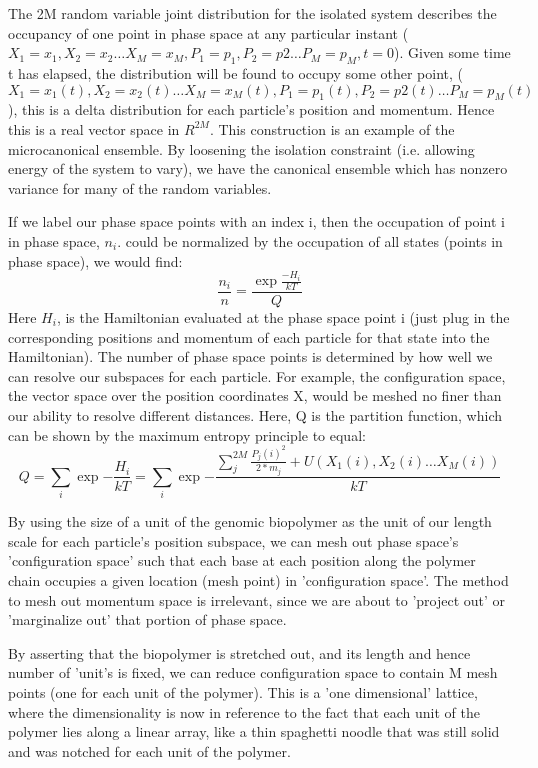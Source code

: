   The 2M random variable joint distribution for the isolated system describes the occupancy of one point in phase space at any particular instant ($X_1=x_1,X_2=x_2\dotsc X_M=x_M, P_1=p_1,P_2=p2\dotsc P_M= p_M,t=0$).  Given some time t has elapsed, the distribution will be found to occupy some other point, ($X_1=x_1(t),X_2=x_2(t)\dotsc X_M=x_M(t), P_1=p_1(t),P_2=p2(t)\dotsc P_M=p_M(t)$), this is a delta distribution for each particle's position and momentum\cite{vankampen}.  Hence this is a real vector space in $R^{2M}$.
     This construction is an example of the microcanonical ensemble.  By loosening the isolation constraint (i.e. allowing energy of the system to vary), we have the canonical ensemble which has nonzero variance for many of the random variables.

 If we label our phase space points with an index i, then the occupation of point i in phase space, $n_i$. could be normalized by the occupation of all states (points in phase space), we would find:
    \begin{equation}\label{}
   \frac{ n_i}{n} =\frac{ \exp\frac{-H_i}{kT} }{ Q }
  \end{equation}
  Here $H_i$, is the Hamiltonian evaluated at the phase space point i (just plug in the corresponding positions and momentum of each particle for that state into the Hamiltonian).  The number of phase space points is determined by how well we can resolve our subspaces for each particle.  For example, the configuration space, the vector space over the position coordinates X, would be meshed no finer than our ability to resolve different distances.  Here, Q is the partition function, which can be shown by the maximum entropy principle to equal:
  \begin{equation}\label{canon}
     Q= \sum_i \exp{-\frac{H_i}{kT}} = \sum_i \exp{-\frac{ \sum_j^{2M} \frac{P_j(i)^2}{2*m_j} + U(X_1(i), X_2(i)\dotsc X_M(i))}{kT} }
  \end{equation}

By using the size of a unit of the genomic biopolymer as the unit of our length scale for each particle's position subspace, we can mesh out phase space's 'configuration space' such that each base at each position along the polymer chain occupies a given location (mesh point) in 'configuration space'.  The method to mesh out momentum space is irrelevant, since we are about to 'project out' or 'marginalize out' that portion of phase space.  

By asserting that the biopolymer is stretched out, and its length and hence number of 'unit's is fixed, we can reduce configuration space to contain M mesh points (one for each unit of the polymer).  This is a 'one dimensional' lattice, where the dimensionality is now in reference to the fact that each unit of the polymer lies along a linear array, like a thin spaghetti noodle that was still solid and was notched for each unit of the polymer.

